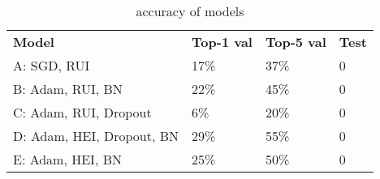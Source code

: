 

\begin{table}[htbp]
\begin{center}
\begin{tabular}{|l|l|l|l|}
\cline{1-4}
\textbf{Model} & \textbf{Top-1 val} & \textbf{Top-5 val} & \textbf{Test}  \\
\cline{1-4}
          A: SGD, RUI                &   17\%  		  &  37\%	      & 0\\
          B: Adam, RUI, BN           &   22\%  		  &  45\%	      & 0\\
          C: Adam, RUI, Dropout      &   6\%      	&  20\%       & 0\\
          D: Adam, HEI, Dropout, BN  &   29\%  	    &  55\% 	    &	0\\
          E: Adam, HEI, BN           &   25\%       &  50\%       & 0\\

\cline{1-4}
\end{tabular}
\caption[]
{\small
accuracy of models
}
\label{table:accuracy}
\end{center}
\end{table}
